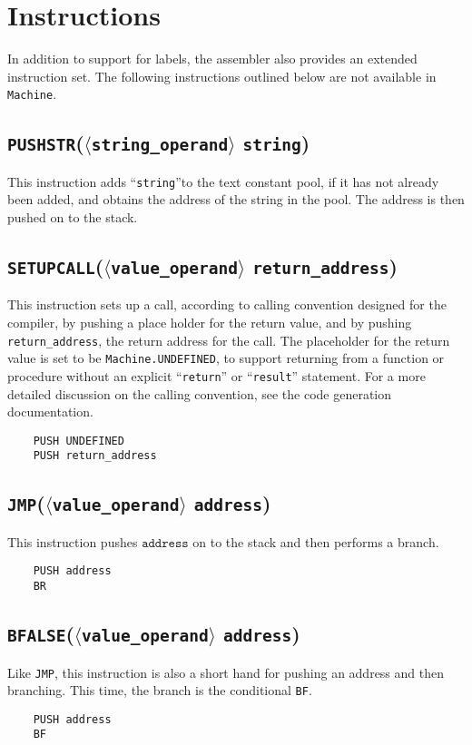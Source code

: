 \documentclass[oneside]{amsart}
\theoremstyle{definition}
\theoremstyle{remark}
\numberwithin{equation}{section}
\begin{document}
\section{Instructions}
In addition to support for labels, the assembler also provides an extended instruction set. The
following instructions outlined below are not available in \texttt{Machine}.
\subsection{\texttt{PUSHSTR}(\texttt{$\langle$string_operand$\rangle$} \texttt{string})}
This instruction adds ``\texttt{string}''to the text constant pool, if it has not already been
added, and obtains the address of the string in the pool. The address is then pushed on to the
stack.
\subsection{\texttt{SETUPCALL}(\texttt{$\langle$value_operand$\rangle$} \texttt{return_address})}
This instruction sets up a call, according to calling convention designed for the compiler, by
pushing a place holder for the return value, and by pushing \texttt{return_address}, the return
address for the call. The placeholder for the return value is set to be \texttt{Machine.UNDEFINED},
to support returning from a function or procedure without an explicit ``\texttt{return}'' or
``\texttt{result}'' statement. For a more detailed discussion on the calling convention, see the
code generation documentation.
\begin{lstlisting}
    PUSH UNDEFINED
    PUSH return_address
\end{lstlisting}
\subsection{\texttt{JMP}(\texttt{$\langle$value_operand$\rangle$} \texttt{address})}
This instruction pushes $\texttt{address}$ on to the stack and then performs a branch.
\begin{lstlisting}
    PUSH address
    BR
\end{lstlisting}
\subsection{\texttt{BFALSE}(\texttt{$\langle$value_operand$\rangle$} \texttt{address})}
Like \texttt{JMP}, this instruction is also a short hand for pushing an address and then branching.
This time, the branch is the conditional \texttt{BF}.
\begin{lstlisting}
    PUSH address
    BF
\end{lstlisting}
\end{document}

